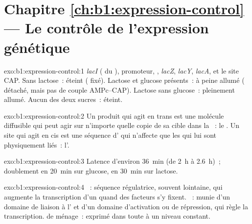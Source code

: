 \section*{Chapitre \ref{ch:b1:expression-control} --- Le contrôle de l'expression génétique}

\begin{solution}{exo:b1:expression-control:1}
\emph{lacI} ( du ), promoteur, , \emph{lacZ},
\emph{lacY}, \emph{lacA}, et le site CAP. Sans lactose~: éteint
( fixé). Lactose et glucose présents~: à peine allumé
( détaché, mais pas de couple AMPc--CAP). Lactose sans
glucose~: pleinement allumé. Aucun des deux sucres~: éteint.
\end{solution}

\begin{solution}{exo:b1:expression-control:2}
Un produit qui agit en trans est une molécule diffusible qui peut agir
sur n'importe quelle copie de sa cible dans la ~: le .
Un site qui agit en cis est une séquence d' qui n'affecte que les
 qui lui sont physiquement liés~: l'.
\end{solution}

\begin{solution}{exo:b1:expression-control:3}
Latence d'environ \qty{36}{min} (de \qty{2}{h} à \qty{2.6}{h})~;
doublement en \qty{20}{min} sur glucose, en \qty{30}{min} sur lactose.
\end{solution}

\begin{solution}{exo:b1:expression-control:4}
~: séquence régulatrice, souvent lointaine, qui augmente la
transcription d'un  quand des facteurs s'y fixent. ~:  munie d'un domaine de liaison à l' et d'un
domaine d'activation ou de répression, qui règle la transcription. 
de ménage~:  exprimé dans toute  à un niveau constant.
\end{solution}

